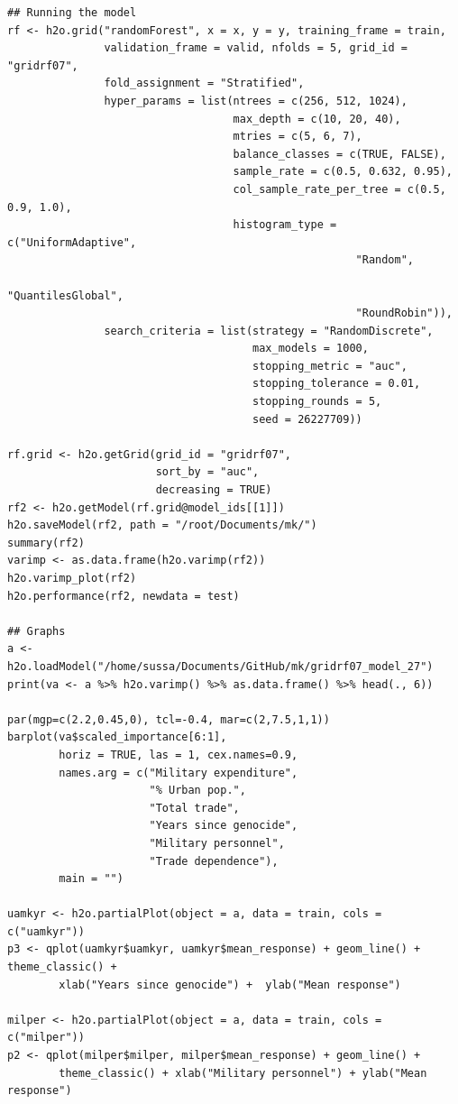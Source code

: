 \documentclass[a4paper,12pt]{article}
\begin{document}
\begin{verbatim}
## Running the model
rf <- h2o.grid("randomForest", x = x, y = y, training_frame = train, 
               validation_frame = valid, nfolds = 5, grid_id = "gridrf07",
               fold_assignment = "Stratified",
               hyper_params = list(ntrees = c(256, 512, 1024),
                                   max_depth = c(10, 20, 40),
                                   mtries = c(5, 6, 7),
                                   balance_classes = c(TRUE, FALSE),
                                   sample_rate = c(0.5, 0.632, 0.95),
                                   col_sample_rate_per_tree = c(0.5, 0.9, 1.0),
                                   histogram_type = c("UniformAdaptive",
                                                      "Random",
                                                      "QuantilesGlobal",
                                                      "RoundRobin")),
               search_criteria = list(strategy = "RandomDiscrete", 
                                      max_models = 1000, 
                                      stopping_metric = "auc", 
                                      stopping_tolerance = 0.01, 
                                      stopping_rounds = 5, 
                                      seed = 26227709)) 

rf.grid <- h2o.getGrid(grid_id = "gridrf07",
                       sort_by = "auc",
                       decreasing = TRUE)
rf2 <- h2o.getModel(rf.grid@model_ids[[1]])
h2o.saveModel(rf2, path = "/root/Documents/mk/")
summary(rf2)
varimp <- as.data.frame(h2o.varimp(rf2))
h2o.varimp_plot(rf2)
h2o.performance(rf2, newdata = test)

## Graphs
a <- h2o.loadModel("/home/sussa/Documents/GitHub/mk/gridrf07_model_27")
print(va <- a %>% h2o.varimp() %>% as.data.frame() %>% head(., 6)) 

par(mgp=c(2.2,0.45,0), tcl=-0.4, mar=c(2,7.5,1,1))
barplot(va$scaled_importance[6:1],
        horiz = TRUE, las = 1, cex.names=0.9,
        names.arg = c("Military expenditure",
                      "% Urban pop.", 
                      "Total trade",
                      "Years since genocide", 
                      "Military personnel", 
                      "Trade dependence"),
        main = "")

uamkyr <- h2o.partialPlot(object = a, data = train, cols = c("uamkyr"))
p3 <- qplot(uamkyr$uamkyr, uamkyr$mean_response) + geom_line() + theme_classic() + 
        xlab("Years since genocide") +  ylab("Mean response")

milper <- h2o.partialPlot(object = a, data = train, cols = c("milper"))
p2 <- qplot(milper$milper, milper$mean_response) + geom_line() +
        theme_classic() + xlab("Military personnel") + ylab("Mean response")


\end{verbatim}
\end{document}
